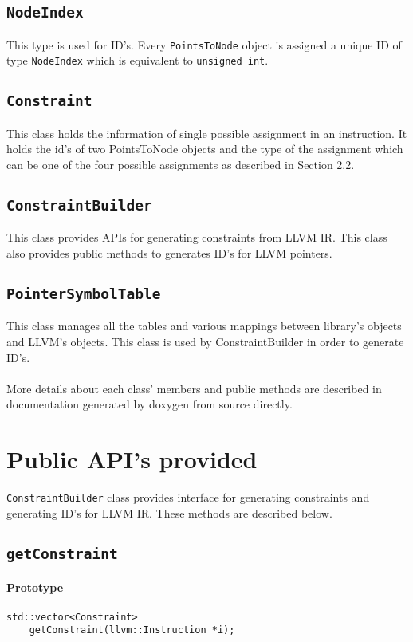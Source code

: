 \documentclass[a4paper,11pt]{report}
\begin{document}
\subsection{\texttt{NodeIndex}}
This type is used for ID's. Every \texttt{PointsToNode} object is assigned
a unique ID of type \texttt{NodeIndex} which is equivalent to \texttt{unsigned int}.

\subsection{\texttt{Constraint}}
This class holds the information of single possible assignment in an 
instruction. It holds the id's of two PointsToNode objects and the type of the 
assignment which can be one of the four possible assignments as described 
in Section 2.2.

\subsection{\texttt{ConstraintBuilder}}
This class provides APIs for generating constraints from LLVM IR. This class 
also provides public methods to generates ID's for LLVM pointers.

\subsection{\texttt{PointerSymbolTable}}
This class manages all the tables and various mappings between library's 
objects and LLVM's objects. This class is used by ConstraintBuilder in order to 
generate ID's.

\paragraph{}
More details about each class' members and public methods are described in 
documentation generated by doxygen from source directly.

\section{Public API's provided}
\texttt{ConstraintBuilder} class provides interface for generating constraints
and generating ID's for LLVM IR. These methods are described below.

\subsection{\texttt{getConstraint}}
\paragraph{Prototype}
\begin{verbatim}
std::vector<Constraint>
    getConstraint(llvm::Instruction *i);
\end{verbatim}
\end{document}
